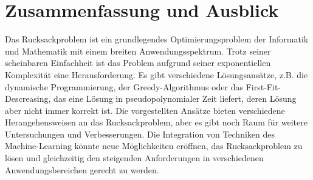 \documentclass[12pt]{report}
\begin{document}
\chapter{Zusammenfassung und Ausblick}
Das Rucksackproblem ist ein grundlegendes Optimierungsproblem der Informatik und Mathematik mit einem breiten Anwendungsspektrum. Trotz seiner scheinbaren Einfachheit ist das Problem aufgrund seiner exponentiellen Komplexität eine Herausforderung. Es gibt verschiedene Lösungsansätze, z.B. die dynamische Programmierung, der Greedy-Algorithmus oder das First-Fit-Descreasing, das eine Lösung in pseudopolynomialer Zeit liefert, deren Lösung aber nicht immer korrekt ist. Die vorgestellten Ansätze bieten verschiedene Herangehensweisen an das Rucksackproblem, aber es gibt noch Raum für weitere Untersuchungen und Verbesserungen. Die Integration von Techniken des Machine-Learning könnte neue Möglichkeiten eröffnen, das Rucksackproblem zu lösen und gleichzeitig den steigenden Anforderungen in verschiedenen Anwendungsbereichen gerecht zu werden.

\newpage
{}
\setcounter{page}{\value{frontmatterPage}} %
\addtocounter{page}{1}

\renewcommand{\refname}{Literaturverzeichnis}


\end{document}
